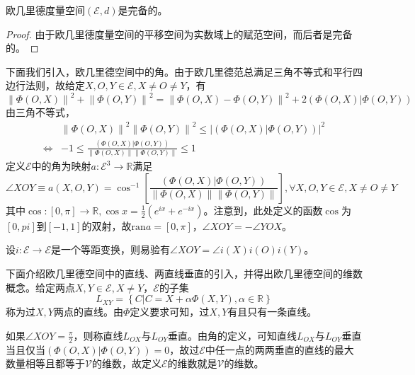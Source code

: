 \documentclass[main.tex]{subfiles}
\begin{document}
\begin{theorem}
欧几里德度量空间$\left(\mathcal{E},d\right)$是完备的。
\end{theorem}
\begin{proof}
由于欧几里德度量空间的平移空间为实数域上的赋范空间，而后者是完备的。
\end{proof}

下面我们引入，欧几里德空间中的角。由于欧几里德范总满足三角不等式和平行四边行法则，故给定$X,O,Y\in\mathcal{E},X\neq O\neq Y$，有
\[
\left\|\Phi\left(O,X\right)\right\|^2+\left\|\Phi\left(O,Y\right)\right\|^2=\left\|\Phi\left(O,X\right)-\Phi\left(O,Y\right)\right\|^2+2\left(\Phi\left(O,X\right)|\Phi\left(O,Y\right)\right)
\]
由三角不等式，
\begin{align*}
&\left\|\Phi\left(O,X\right)\right\|^2\left\|\Phi\left(O,Y\right)\right\|^2\leq\left|\left(\Phi\left(O,X\right)|\Phi\left(O,Y\right)\right)\right|^2\\
\Leftrightarrow&-1\leq\frac{\left(\Phi\left(O,X\right)|\Phi\left(O,Y\right)\right)}{\left\|\Phi\left(O,X\right)\right\|\left\|\Phi\left(O,Y\right)\right\|}\leq1
\end{align*}
定义$\mathcal{E}$中的角为映射$a:\mathcal{E}^3\rightarrow\mathbb{R}$满足
\[\angle{XOY}\equiv a\left(X,O,Y\right)=\cos^{-1}\left[\frac{\left(\Phi\left(O,X\right)|\Phi\left(O,Y\right)\right)}{\left\|\Phi\left(O,X\right)\right\|\left\|\Phi\left(O,Y\right)\right\|}\right],\forall X,O,Y\in\mathcal{E},X\neq O\neq Y
\]
其中$\cos:\left[0,\pi\right]\rightarrow\mathbb{R},\cos x=\frac{1}{2}\left(e^{ix}+e^{-ix}\right)$。注意到，此处定义的函数$\cos$为$\left[0,pi\right]$到$\left[-1,1\right]$的双射，故$\mathrm{ran}a=\left[0,\pi\right]$，$\angle{XOY}=-\angle{YOX}$。

设$i:\mathcal{E}\rightarrow\mathcal{E}$是一个等距变换，则易验有$\angle{XOY}=\angle{i\left(X\right)i\left(O\right)i\left(Y\right)}$。

下面介绍欧几里德空间中的直线、两直线垂直的引入，并得出欧几里德空间的维数概念。给定两点$X,Y\in\mathcal{E},X\neq Y$，$\mathcal{E}$的子集
\[
L_{XY}=\left\{C|C=X+\alpha\Phi\left(X,Y\right),\alpha\in\mathbb{R}\right\}
\]
称为过$X,Y$两点的直线。由$\Phi$定义要求可知，过$X,Y$有且只有一条直线。

如果$\angle{XOY}=\frac{\pi}{2}$，则称直线$L_{OX}$与$L_{OY}$垂直。由角的定义，可知直线$L_{OX}$与$L_{OY}$垂直当且仅当$\left(\Phi\left(O,X\right)|\Phi\left(O,Y\right)\right)=0$，故过$\mathcal{E}$中任一点的两两垂直的直线的最大数量相等且都等于$\mathcal{V}$的维数，故定义$\mathcal{E}$的维数就是$\mathcal{V}$的维数。
\end{document}
